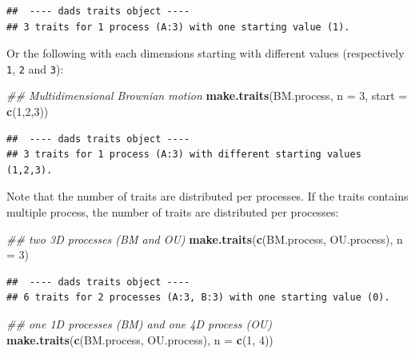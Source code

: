 \documentclass[]{book}
\newenvironment{Shaded}{\begin{snugshade}}{\end{snugshade}}
\newcommand{\CommentTok}[1]{\textcolor[rgb]{0.56,0.35,0.01}{\textit{#1}}}
\newcommand{\DataTypeTok}[1]{\textcolor[rgb]{0.13,0.29,0.53}{#1}}
\newcommand{\DecValTok}[1]{\textcolor[rgb]{0.00,0.00,0.81}{#1}}
\newcommand{\KeywordTok}[1]{\textcolor[rgb]{0.13,0.29,0.53}{\textbf{#1}}}
\newcommand{\NormalTok}[1]{#1}
\begin{document}
\begin{verbatim}
##  ---- dads traits object ---- 
## 3 traits for 1 process (A:3) with one starting value (1).
\end{verbatim}

Or the following with each dimensions starting with different values (respectively \texttt{1}, \texttt{2} and \texttt{3}):

\begin{Shaded}
\begin{Highlighting}[]
\CommentTok{## Multidimensional Brownian motion}
\KeywordTok{make.traits}\NormalTok{(BM.process, }\DataTypeTok{n =} \DecValTok{3}\NormalTok{, }\DataTypeTok{start =} \KeywordTok{c}\NormalTok{(}\DecValTok{1}\NormalTok{,}\DecValTok{2}\NormalTok{,}\DecValTok{3}\NormalTok{))}
\end{Highlighting}
\end{Shaded}

\begin{verbatim}
##  ---- dads traits object ---- 
## 3 traits for 1 process (A:3) with different starting values (1,2,3).
\end{verbatim}

Note that the number of traits are distributed per processes.
If the traits contains multiple process, the number of traits are distributed per processes:

\begin{Shaded}
\begin{Highlighting}[]
\CommentTok{## two 3D processes (BM and OU)}
\KeywordTok{make.traits}\NormalTok{(}\KeywordTok{c}\NormalTok{(BM.process, OU.process), }\DataTypeTok{n =} \DecValTok{3}\NormalTok{)}
\end{Highlighting}
\end{Shaded}

\begin{verbatim}
##  ---- dads traits object ---- 
## 6 traits for 2 processes (A:3, B:3) with one starting value (0).
\end{verbatim}

\begin{Shaded}
\begin{Highlighting}[]
\CommentTok{## one 1D processes (BM) and one 4D process (OU)}
\KeywordTok{make.traits}\NormalTok{(}\KeywordTok{c}\NormalTok{(BM.process, OU.process), }\DataTypeTok{n =} \KeywordTok{c}\NormalTok{(}\DecValTok{1}\NormalTok{, }\DecValTok{4}\NormalTok{))}
\end{Highlighting}
\end{Shaded}
\end{document}

